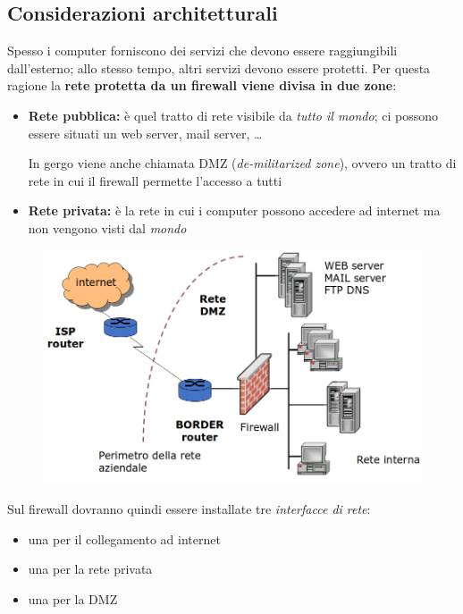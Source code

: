 \subsection{Considerazioni architetturali}

Spesso i computer forniscono dei servizi che devono essere raggiungibili 
dall'esterno; allo stesso tempo, altri servizi devono essere protetti.
Per questa ragione la \textbf{rete protetta da un firewall viene divisa in due zone}:
\begin{itemize}
    \item \textbf{Rete pubblica:} è quel tratto di rete visibile da \textit{tutto il mondo}; ci possono essere situati
    un web server, mail server, \dots

    \noindent In gergo viene anche chiamata DMZ (\textit{de-militarized zone}), ovvero un tratto di rete in cui 
    il firewall permette l'accesso a tutti
    \item \textbf{Rete privata:} è la rete in cui i computer possono accedere ad internet ma non vengono
    visti dal \textit{mondo}
\end{itemize}

\begin{figure}[H]
    \centering
    \includegraphics[width=1\linewidth]{chapters/11/images/zone.png}
\end{figure}

\noindent Sul firewall dovranno quindi essere installate tre \textit{interfacce di rete}:
\begin{itemize}
    \item una per il collegamento ad internet 
    \item una per la rete privata 
    \item una per la DMZ
\end{itemize}

